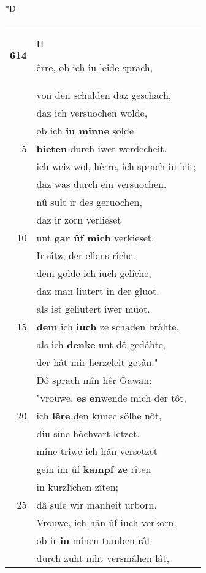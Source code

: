 \documentclass[8pt,a4paper,notitlepage]{article}
\begin{document}
\begin{table}[ht]
\begin{minipage}[t]{0.5\linewidth}
\small
\begin{center}*D
\end{center}
\begin{tabular}{rl}
\textbf{614} & \begin{large}H\end{large}êrre, ob ich iu leide sprach,\\ 
 & von den schulden daz geschach,\\ 
 & daz ich versuochen wolde,\\ 
 & ob ich \textbf{iu minne} solde\\ 
5 & \textbf{bieten} durch iwer werdecheit.\\ 
 & ich weiz wol, hêrre, ich sprach iu leit;\\ 
 & daz was durch ein versuochen.\\ 
 & nû sult ir des geruochen,\\ 
 & daz ir zorn verlieset\\ 
10 & unt \textbf{gar ûf mich} verkieset.\\ 
 & Ir sît\textbf{z}, der ellens rîche.\\ 
 & dem golde ich iuch gelîche,\\ 
 & daz man liutert in der gluot.\\ 
 & als ist geliutert iwer muot.\\ 
15 & \textbf{dem} ich \textbf{iuch} ze schaden brâhte,\\ 
 & als ich \textbf{denke} unt dô gedâhte,\\ 
 & der hât mir herzeleit getân."\\ 
 & Dô sprach mîn hêr Gawan:\\ 
 & "vrouwe, \textbf{es} \textbf{en}wende mich der tôt,\\ 
20 & ich \textbf{lêre} den künec sölhe nôt,\\ 
 & diu sîne hôchvart letzet.\\ 
 & mîne triwe ich hân versetzet\\ 
 & gein im ûf \textbf{kampf ze} rîten\\ 
 & in kurzlîchen zîten;\\ 
25 & dâ sule wir manheit urborn.\\ 
 & Vrouwe, ich hân ûf iuch verkorn.\\ 
 & ob ir \textbf{iu} mînen tumben rât\\ 
 & durch zuht niht versmâhen lât,\\ 

\end{tabular}
\end{minipage}
\end{table}
\end{document}
